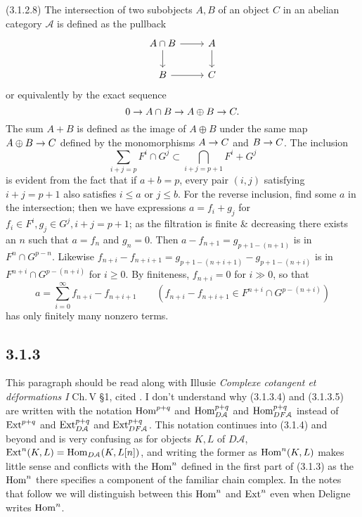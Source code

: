 \documentclass[deligne.tex]{subfiles}
\begin{document}
(3.1.2.8) The intersection of two subobjects $A,B$ of an object $C$ in an
abelian category $\mathcal A$ is defined as the pullback
\begin{equation*}\begin{tikzcd}
	A\cap B\arrow[d]\arrow[r]&A\arrow[d] \\
	B\arrow[r]&C
\end{tikzcd}\end{equation*}
or equivalently by the exact sequence
\begin{equation*}
	0\rightarrow A\cap B\rightarrow A\oplus B\rightarrow C.
\end{equation*}
The sum $A+B$ is defined as the image of $A\oplus B$ under the same map
$A\oplus B\rightarrow C$ defined by the monomorphisms $A\rightarrow C$ and $B\rightarrow C$.
The inclusion
\begin{equation*}
	\sum_{i+j=p}F^i\cap G^j\subset\bigcap_{i+j=p+1}F^i+G^j
\end{equation*}
is evident from the fact that if $a+b=p$, every pair $(i,j)$ satisfying
$i+j=p+1$ also satisfies $i\leq a$ or $j\leq b$.
For the reverse inclusion, find some $a$ in the intersection; then we
have expressions $a=f_i+g_j$ for $f_i\in F^i, g_j\in G^j,i+j=p+1$; as the 
filtration is finite \& decreasing there exists an $n$ such that
$a=f_n$ and $g_n=0$.
Then $a-f_{n+1}=g_{p+1-(n+1)}$ is in $F^n\cap G^{p-n}$.
Likewise $f_{n+i}-f_{n+i+1}=g_{p+1-(n+i+1)}-g_{p+1-(n+i)}$ is in
$F^{n+i}\cap G^{p-(n+i)}$ for $i\geq0$.
By finiteness, $f_{n+i}=0$ for $i\gg0$, so that
\begin{equation*}
	a=\sum_{i=0}^{\infty} f_{n+i}-f_{n+i+1}\qquad
	(f_{n+i}-f_{n+i+1}\in F^{n+i}\cap G^{p-(n+i)})
\end{equation*}
has only finitely many nonzero terms.

\subsection*{3.1.3} This paragraph should be read along with
Illusie \emph{Complexe cotangent et déformations I} Ch.\,V \S1, cited
\cite{Cotangent}. I don't understand why (3.1.3.4) and (3.1.3.5) are
written with the notation
$\operatorname{Hom}^{p+q}$ and $\operatorname{Hom}_{D\mathcal A}^{p+q}$ and $\operatorname{Hom}_{DF\mathcal A}^{p+q}$ 
instead of
$\operatorname{Ext}^{p+q}$ and $\operatorname{Ext}_{D\mathcal A}^{p+q}$ and $\operatorname{Ext}_{DF\mathcal A}^{p+q}$.
This notation continues into (3.1.4) and beyond and is very confusing
as for objects $K,L$ of $D\mathcal A$,
$\operatorname{Ext}^n(K,L)=\operatorname{Hom}_{D\mathcal A}(K,L[n])$, and writing the former as
$\operatorname{Hom}^n(K,L)$ makes little sense and conflicts with the $\operatorname{Hom}^n$
defined in the first part of (3.1.3) as the $\operatorname{Hom}^n$ there specifies a
component of the familiar chain complex. In the notes that follow we will
distinguish between this $\operatorname{Hom}^n$ and $\operatorname{Ext}^n$ even when Deligne writes
$\operatorname{Hom}^n$.
\end{document}
